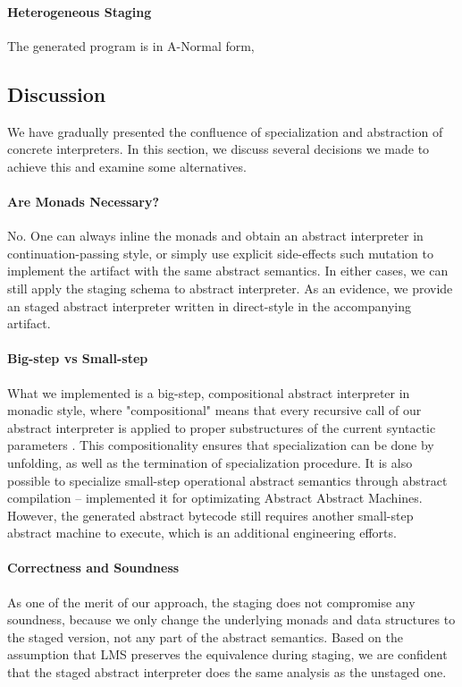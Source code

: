 \paragraph{Heterogeneous Staging} The generated program is in A-Normal form, 

\subsection{Discussion}

We have gradually presented the confluence of specialization and abstraction of
concrete interpreters. In this section, we discuss several decisions we made to
achieve this and examine some alternatives.

\paragraph{Are Monads Necessary?} No. One can always inline the monads and
obtain an abstract interpreter in continuation-passing style, or simply use
explicit side-effects such mutation to implement the artifact with the same
abstract semantics. In either cases, we can still apply the staging schema to
abstract interpreter. As an evidence, we provide an staged abstract interpreter
written in direct-style in the accompanying artifact.

\paragraph{Big-step vs Small-step}

What we implemented is a big-step, compositional abstract interpreter in monadic
style, where "compositional" means that every recursive call of our abstract
interpreter is applied to proper substructures of the current syntactic
parameters \cite{10.1007/3-540-61580-6_11}. This compositionality ensures that
specialization can be done by unfolding, as well as the termination of
specialization procedure. It is also possible to specialize small-step
operational abstract semantics through abstract compilation
\cite{Boucher:1996:ACN:647473.727587} --
\citet{Johnson:2013:OAA:2500365.2500604} implemented it for
optimizating Abstract Abstract Machines. However, the generated abstract
bytecode still requires another small-step abstract machine to execute, which is
an additional engineering efforts.


\paragraph{Correctness and Soundness}

As one of the merit of our approach, the staging does not compromise any
soundness, because we only change the underlying monads and data structures to
the staged version, not any part of the abstract semantics. Based on the
assumption that LMS preserves the equivalence during staging, we are confident
that the staged abstract interpreter does the same analysis as the unstaged one.

